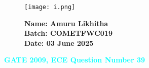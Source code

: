 \documentclass[12pt]{article}
\begin{document}
\begin{figure}[H]
    \begin{minipage}{0.45\textwidth}
        \texttt{[image: i.png]} %
    \end{minipage} \hfill
    \begin{minipage}{0.45\textwidth}
        \textbf{Name: Amuru Likhitha} \\
        \textbf{Batch: COMETFWC019} \\
        \textbf{Date: 03 June 2025}
    \end{minipage}
\end{figure}

\begin{center}
    {\LARGE \textbf{\textcolor{cyan}{GATE 2009, ECE Question Number 39}}}
\end{center}
\vspace{1em}
\end{document}
